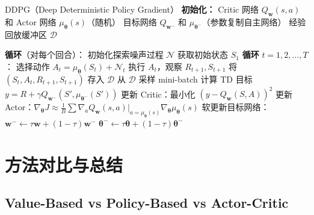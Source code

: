 \begin{myalgorithm}{DDPG（Deep Deterministic Policy Gradient）}
\textbf{初始化：}
\quad Critic 网络 $Q_{\mathbf{w}}(s,a)$ 和 Actor 网络 $\mu_{\boldsymbol{\theta}}(s)$（随机）
\quad 目标网络 $Q_{\mathbf{w}^{-}}$ 和 $\mu_{\boldsymbol{\theta}^{-}}$（参数复制自主网络）
\quad 经验回放缓冲区 $\mathcal{D}$

\textbf{循环}（对每个回合）：
\quad 初始化探索噪声过程 $\mathcal{N}$
\quad 获取初始状态 $S_1$
\quad \textbf{循环} $t = 1, 2, \ldots, T$：
\quad \quad 选择动作 $A_t = \mu_{\boldsymbol{\theta}}(S_t) + \mathcal{N}_t$
\quad \quad 执行 $A_t$，观察 $R_{t+1}, S_{t+1}$
\quad \quad 将 $(S_t, A_t, R_{t+1}, S_{t+1})$ 存入 $\mathcal{D}$
\quad \quad 从 $\mathcal{D}$ 采样 mini-batch
\quad \quad 计算 TD 目标 $y = R + \gamma Q_{\mathbf{w}^{-}}(S', \mu_{\boldsymbol{\theta}^{-}}(S'))$
\quad \quad 更新 Critic：最小化 $(y - Q_{\mathbf{w}}(S,A))^2$
\quad \quad 更新 Actor：$\nabla_{\boldsymbol{\theta}} J \approx \frac{1}{B}\sum \nabla_a Q_{\mathbf{w}}(s,a)|_{a=\mu_{\boldsymbol{\theta}}(s)} \nabla_{\boldsymbol{\theta}} \mu_{\boldsymbol{\theta}}(s)$
\quad \quad 软更新目标网络：$\mathbf{w}^{-} \leftarrow \tau \mathbf{w} + (1-\tau)\mathbf{w}^{-}$
\quad \quad \quad \quad \quad \quad \;\; $\boldsymbol{\theta}^{-} \leftarrow \tau \boldsymbol{\theta} + (1-\tau)\boldsymbol{\theta}^{-}$
\end{myalgorithm}

\section{方法对比与总结}

\subsection{Value-Based vs Policy-Based vs Actor-Critic}

